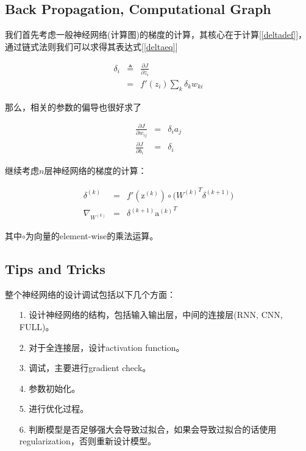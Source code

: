 \documentclass{article}
\begin{document}
\subsection{Back Propagation, Computational Graph}

我们首先考虑一般神经网络(计算图)的梯度的计算，其核心在于计算[\ref{deltadef}]，通过链式法则我们可以求得其表达式[\ref{deltaeq}]

\begin{eqnarray}
\label{deltadef}
\delta_i &\triangleq& \frac{\partial J}{\partial z_i} \\
\label{deltaeq}
&=& f'(z_i)\sum_{k}{\delta_k w_{ki}}
\end{eqnarray}

那么，相关的参数的偏导也很好求了

\begin{eqnarray}
\frac{\partial J}{\partial w_{ij}} &=& \delta_i a_j \\
\frac{\partial J}{\partial b_{i}} &=& \delta_i
\end{eqnarray}

继续考虑$n$层神经网络的梯度的计算：

\begin{eqnarray}
\delta^{(k)}&=&f'(\mathrm{z}^{(k)})\circ\big({W^{(k)}}^T\delta^{(k+1)}\big)\\
\nabla_{W^{(k)}}&=&\delta^{(k+1)}{\mathrm{a}^{(k)}}^T
\end{eqnarray}

其中$\circ$为向量的element-wise的乘法运算。

\subsection{Tips and Tricks}

整个神经网络的设计调试包括以下几个方面：

\begin{itemize}
	\item[1.] 设计神经网络的结构，包括输入输出层，中间的连接层(RNN, CNN, FULL)。
	\item[2.] 对于全连接层，设计activation function。
	\item[3.] 调试，主要进行gradient check。
	\item[4.] 参数初始化。
	\item[5.] 进行优化过程。
	\item[6.] 判断模型是否足够强大会导致过拟合，如果会导致过拟合的话使用regularization，否则重新设计模型。
\end{itemize}
\end{document}
